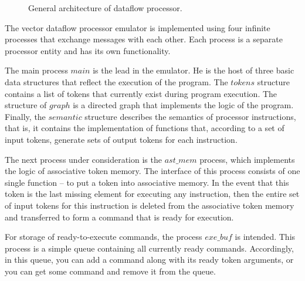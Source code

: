 \documentclass[
11pt,%
tightenlines,%
twoside,%
onecolumn,%
nofloats,%
nobibnotes,%
nofootinbib,%
superscriptaddress,%
noshowpacs,%
centertags]%
{revtex4}
\begin{document}
\begin{figure}[h!]
\caption{General architecture of dataflow
processor.} \label{fig:big-scheme}
\end{figure}

The vector dataflow processor emulator is implemented using four infinite processes that exchange messages with each other.
Each process is a separate processor entity and has its own functionality.

The main process $main$ is the lead in the emulator.
He is the host of three basic data structures that reflect the execution of the program.
The $tokens$ structure contains a list of tokens that currently exist during program execution.
The structure of $graph$ is a directed graph that implements the logic of the program.
Finally, the $semantic$ structure describes the semantics of processor instructions, that is, it contains the implementation of functions that, according to a set of input tokens, generate sets of output tokens for each instruction.

The next process under consideration is the $ast\_mem$ process, which implements the logic of associative token memory.
The interface of this process consists of one single function -- to put a token into associative memory.
In the event that this token is the last missing element for executing any instruction, then the entire set of input tokens for this instruction is deleted from the associative token memory and transferred to form a command that is ready for execution.

For storage of ready-to-execute commands, the process $exe\_buf$ is intended.
This process is a simple queue containing all currently ready commands.
Accordingly, in this queue, you can add a command along with its ready token arguments, or you can get some command and remove it from the queue.
\end{document}
